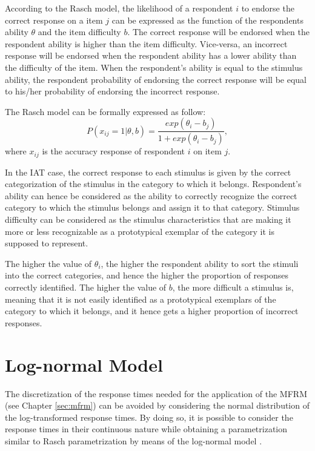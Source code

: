 \documentclass[12pt]{book}
\begin{document}
According to the Rasch model, the likelihood of a respondent $i$ to endorse the correct response on a item $j$ can be expressed as the function of the respondents ability $\theta$ and the item difficulty $b$. The correct response will be endorsed when the respondent ability is higher than the item difficulty. Vice-versa, an incorrect response will be endorsed when the respondent ability has a lower ability than the difficulty of the item. When the respondent's ability is equal to the stimulus ability, the respondent probability of endorsing the correct response will be equal to his/her probability of endorsing the incorrect response. 

The Rasch model can be formally expressed as follow:
%
\begin{equation}\label{eq:rasch}
P(x_{ij} = 1|\theta, b) = \frac{exp(\theta_i - b_j)}{1 + exp(\theta_i - b_j)},
\end{equation}
%
where $x_{ij}$ is the accuracy response of respondent $i$ on item $j$. 

In the IAT case, the correct response to each stimulus is given by the correct categorization of the stimulus in the category to which it belongs. Respondent's ability can hence be considered as the ability to correctly recognize the correct category to which the stimulus belongs and assign it to that category. Stimulus difficulty can be considered as the stimulus characteristics that are making it more or less recognizable as a prototypical exemplar of the category it is supposed to represent. 

The higher the value of $\theta_i$, the higher the respondent ability to sort the stimuli into the correct categories, and hence the higher the proportion of responses correctly identified. The higher the value of $b$, the more difficult a stimulus is, meaning that it is not easily identified as a prototypical exemplars of the category to which it belongs, and it hence gets a higher proportion of incorrect responses.

\section{Log-normal Model}

The discretization of the response times needed for the application of the MFRM (see Chapter \ref{sec:mfrm}) can be avoided by considering the normal distribution of the log-transformed response times. By doing so, it is possible to consider the response times in their continuous nature while obtaining a parametrization similar to Rasch parametrization by means of the log-normal model \cite{van2006}. 
\end{document}
